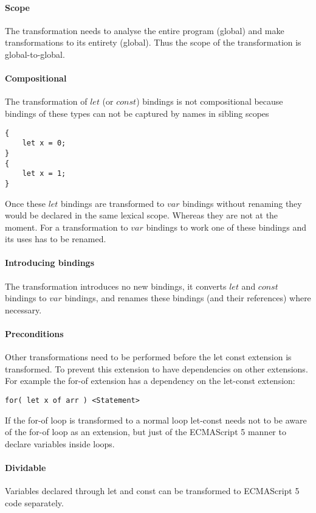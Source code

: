 \paragraph{Scope}
The transformation needs to analyse the entire program (global) and make transformations to its entirety (global). Thus the scope of the transformation is global-to-global.

\paragraph{Compositional}
The transformation of $let$ (or $const$) bindings is not compositional because bindings of these types can not be captured by names in sibling scopes

\begin{lstlisting}
{
	let x = 0;
}
{
	let x = 1;
}
\end{lstlisting} 

Once these $let$ bindings are transformed to $var$ bindings without renaming they would be declared in the same lexical scope. Whereas they are not at the moment. For a transformation to $var$ bindings to work one of these bindings and its uses has to be renamed.

\paragraph{Introducing bindings}
The transformation introduces no new bindings, it converts $let$ and $const$ bindings to $var$ bindings, and renames these bindings (and their references) where necessary.

\paragraph{Preconditions}
Other transformations need to be performed before the let const extension is transformed. To prevent this extension to have dependencies on other extensions. For example the for-of extension has a dependency on the let-const extension:

\begin{lstlisting}
for( let x of arr ) <Statement>
\end{lstlisting}

If the for-of loop is transformed to a normal loop let-const needs not to be aware of the for-of loop as an extension, but just of the ECMAScript 5 manner to declare variables inside loops.

\paragraph{Dividable}
Variables declared through let and const can be transformed to ECMAScript 5 code separately.